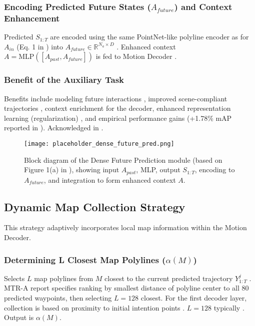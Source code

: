 \subsubsection{Encoding Predicted Future States ($A_{future}$) and Context Enhancement}
Predicted $S_{1:T}$ are encoded using the same PointNet-like polyline encoder as for $A_{in}$ (Eq. 1 in \cite{Shi2022MTR}) into $A_{future} \in \mathbb{R}^{N_a \times D}$ \cite{Shi2022MTR}. Enhanced context $A = \text{MLP}([A_{past}, A_{future}])$ is fed to Motion Decoder \cite{Shi2022MTR}.

\subsubsection{Benefit of the Auxiliary Task}
Benefits include modeling future interactions \cite{Shi2022MTR}, improved scene-compliant trajectories \cite{Shi2022MTR}, context enrichment for the decoder, enhanced representation learning (regularization) \cite{Shi2022MTR}, and empirical performance gains (+1.78\% mAP reported in \cite{Shi2022MTR}). Acknowledged in \cite{Shi2023MTRplusplus}.

\begin{figure}[h!]
    \centering
    \texttt{[image: placeholder\_dense\_future\_pred.png]} %
    \caption{Block diagram of the Dense Future Prediction module (based on Figure 1(a) in \cite{Shi2022MTR}), showing input $A_{past}$, MLP, output $S_{1:T}$, encoding to $A_{future}$, and integration to form enhanced context $A$.}
    \label{fig:dense_future_pred}
\end{figure}

\subsection{Dynamic Map Collection Strategy}
\label{subsec:dynamic_map_collection}

This strategy adaptively incorporates local map information within the Motion Decoder.

\subsubsection{Determining L Closest Map Polylines ($\alpha(M)$)}
Selects $L$ map polylines from $M$ closest to the current predicted trajectory $Y_{1:T}^j$ \cite{Shi2022MTR}. MTR-A report \cite{Shi2022MTR_A} specifies ranking by smallest distance of polyline center to all 80 predicted waypoints, then selecting $L=128$ closest. For the first decoder layer, collection is based on proximity to initial intention points \cite{Shi2022MTR_A}. $L=128$ typically \cite{Shi2022MTR, Shi2022MTR_A}. Output is $\alpha(M)$.

